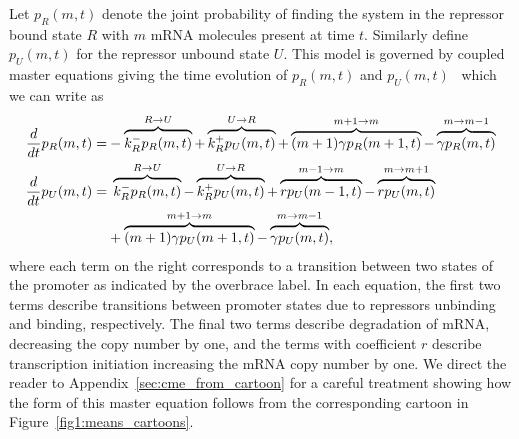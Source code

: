Let $p_R(m,t)$ denote the joint probability of finding the system in the
repressor bound state $R$ with $m$ mRNA molecules present at time $t$. Similarly
define $p_U(m,t)$ for the repressor unbound state $U$. This model is governed
by coupled master equations giving the time evolution of $p_R(m,t)$ and
$p_U(m,t)$~\cite{Sanchez2008, Sanchez2011, Phillips2019} which we can write as
\begin{align}
\begin{split}
\frac{d {}}{d t}p_R(m,t) =& 
- \overbrace{k_R^- p_R(m,t)}^{R \rightarrow U}
+ \overbrace{k_R^+ p_U(m,t)}^{U \rightarrow R}
+ \overbrace{(m+1)\gamma p_R(m+1,t)}^{m + 1 \rightarrow m}
- \overbrace{\gamma p_R(m,t)}^{m \rightarrow m - 1}
\\
\frac{d {}}{d t}p_U(m,t) =&\; 
\overbrace{k_R^- p_R(m,t)}^{R \rightarrow U}
- \overbrace{k_R^+ p_U(m,t)}^{U \rightarrow R}
+ \overbrace{rp_U(m-1,t)}^{m-1 \rightarrow m}
- \overbrace{rp_U(m,t)}^{m \rightarrow m + 1}
\\
&+ \overbrace{(m+1)\gamma p_U(m+1,t)}^{m + 1 \rightarrow m}
- \overbrace{\gamma p_U(m,t)}^{m \rightarrow m - 1},
\label{eq:poisson_promoter_cme}
\end{split}
\end{align}
where each term on the right corresponds to a transition between two states of
the promoter as indicated by the overbrace label. In each equation, the first
two terms describe transitions between promoter states due to repressors
unbinding and binding, respectively. The final two terms describe degradation of
mRNA, decreasing the copy number by one, and the terms with coefficient $r$
describe transcription initiation increasing the mRNA copy number by one.
We direct the reader to Appendix~\ref{sec:cme_from_cartoon} for a careful
treatment showing how the form of this master equation follows from the
corresponding cartoon in Figure~\ref{fig1:means_cartoons}.

